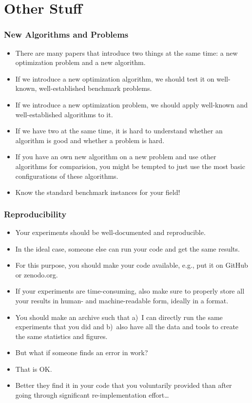 \documentclass[aspectratio=169,mathserif,notheorems]{beamer}%
\begin{document}
\section{Other Stuff}%
%
\begin{frame}\frametitle{New Algorithms and Problems}%
\begin{itemize}%
\item There are many papers that introduce two things at the same time: a new optimization problem and a new algorithm.%
\item<3-> If we introduce a new optimization algorithm, we should test it on well-known, well-established benchmark problems.%
\item<5-> If we introduce a new optimization problem, we should apply well-known and well-established algorithms to it.%
\item<7-> If we have two  at the same time, it is hard to understand whether an algorithm is good and whether a problem is hard.%
\item<8-> If you have an own new algorithm on a new problem and use other algorithms for comparision, you might be tempted to just use the most basic configurations of these algorithms.%
\item<10> \alert{Know the standard benchmark instances for your field!}%
\end{itemize}%
\end{frame}%
%
\begin{frame}\frametitle{Reproducibility}%
\begin{itemize}%
\item Your experiments should be well-documented and reproducible.%
\item<2-> In the ideal case, someone else can run your code and get the same results.%
\item<3-> For this purpose, you should make your code available, e.g., put it on GitHub or zenodo.org.%
\item<4-> If your experiments are time-consuming, also make sure to properly store all your results in human- and machine-readable form, ideally in a  format.%
\item<5-> You should make an archive such that a)~I can directly run the same experiments that you did and b)~also have all the data and tools to create the same statistics and figures.%
\item<6-> \alert{But what if someone finds an error in work?}%
\item<7-> That is OK.%
\item<8-> Better they find it in your \alert{code} that you voluntarily provided than after going through significant re-implementation effort\dots%
\end{itemize}%
\end{frame}%
\end{document}
